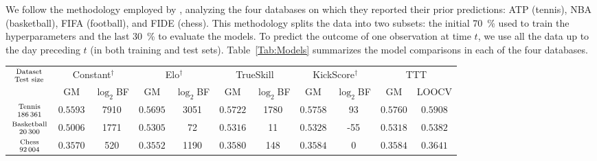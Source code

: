 \documentclass[article]{jss}
\newcommand\hfrac[2]{\genfrac{}{}{0pt}{}{#1}{#2}} %
\begin{document}

We follow the methodology employed by \cite{Maystre2019}, analyzing the four databases on which they reported their prior predictions: ATP (tennis), NBA (basketball), FIFA (football), and FIDE (chess).
This methodology splits the data into two subsets: the initial \SI{70}{\percent} used to train the hyperparameters and the last \SI{30}{\percent} to evaluate the models.
To predict the outcome of one observation at time $t$, we use all the data up to the day preceding $t$ (in both training and test sets).
Table~\ref{Tab:Models} summarizes the model comparisons in each of the four databases.
%
\begin{table}[ht!] \centering
\scriptsize
\begin{tabular}{c|cc|cc|cc|cc|c||c}
  \multirow{2}{*}{$\hfrac{\text{\scriptsize Dataset}}{\text{Test size}}$} & \multicolumn{2}{c|}{Constant$^\dagger$}& \multicolumn{2}{c|}{Elo$^\dagger$} & \multicolumn{2}{c|}{TrueSkill} & \multicolumn{2}{c|}{KickScore$^\dagger$} &  \multicolumn{2}{c}{TTT} \\
  & GM & $\log_2$BF & GM & $\log_2$BF & GM & $\log_2$BF & GM & $\log_2$BF & GM & LOOCV \\ \hline
  \multirow{2}{*}{$\hfrac{\text{\scriptsize Tennis}}{\num{186361}}$} & \multirow{2}{*}{$0.5593$} & \multirow{2}{*}{\num{7910}} & \multirow{2}{*}{$0.5695$} & \multirow{2}{*}{\num{3051}} & \multirow{2}{*}{$0.5722$} & \multirow{2}{*}{\num{1780}} & \multirow{2}{*}{$0.5758$} & \multirow{2}{*}{\num{93}} & \multirow{2}{*}{$\bm{0.5760}$} & \multirow{2}{*}{${0.5908}$} \\
  & & & & & & & & & & \\
  \multirow{2}{*}{$\hfrac{\text{\scriptsize Basketball}}{\num{20300}}$} & \multirow{2}{*}{$0.5006$} & \multirow{2}{*}{\num{1771}} & \multirow{2}{*}{$0.5305$} & \multirow{2}{*}{\num{72}} & \multirow{2}{*}{$0.5316$} & \multirow{2}{*}{\num{11}} & \multirow{2}{*}{$\bm{0.5328}$} & \multirow{2}{*}{-55} & \multirow{2}{*}{${0.5318}$} & \multirow{2}{*}{${0.5382}$} \\
    & & & & & & & & & & \\
  \multirow{2}{*}{$\hfrac{\text{\scriptsize Chess}}{\num{92004}}$} & \multirow{2}{*}{$0.3570$} & \multirow{2}{*}{\num{520}} & \multirow{2}{*}{$0.3552$} & \multirow{2}{*}{\num{1190}} & \multirow{2}{*}{$0.3580$} & \multirow{2}{*}{\num{148}} & \multirow{2}{*}{$\bm{0.3584}$} & \multirow{2}{*}{0} & \multirow{2}{*}{$\bm{0.3584}$} & \multirow{2}{*}{${0.3641}$} \\
  & & & & & & & & & \\

\end{tabular}
\end{table}
\end{document}
